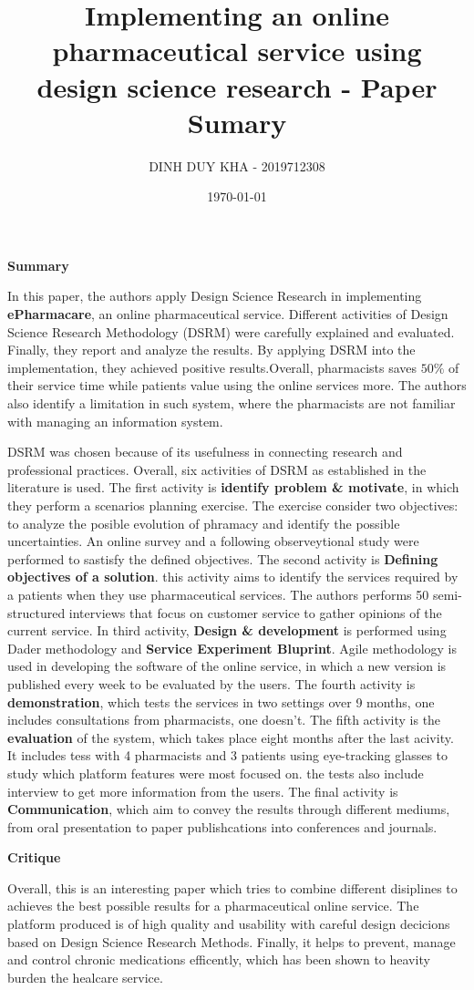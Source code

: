\documentclass[11pt]{article}
\author{DINH DUY KHA - 2019712308}
\date{\today}
\title{Implementing an online pharmaceutical service using design science research - Paper Sumary}
\begin{document}
\maketitle
\tableofcontents

\textbf{Summary}

In this paper, the authors apply Design Science Research in implementing \textbf{ePharmacare}, an online pharmaceutical service. Different activities of Design Science Research Methodology (DSRM) were carefully explained and evaluated. Finally, they report and analyze the results.
By applying DSRM into the implementation, they achieved positive results.Overall, pharmacists saves \(50\%\) of their service time while patients value using the online services more. The authors also identify a limitation in such system, where the pharmacists are not familiar with managing an information system.

DSRM was chosen because of its usefulness in connecting research and professional practices. Overall, six activities of DSRM as established in the literature is used. The first activity is \textbf{identify problem \& motivate}, in which they perform a scenarios planning exercise. The exercise consider two objectives: to analyze the posible evolution of phramacy and identify the possible uncertainties. An online survey and a following observeytional study were performed to sastisfy the defined objectives.
The second activity is \textbf{Defining objectives of a solution}. this activity aims to identify the services required by a patients when they use pharmaceutical services. The authors performs 50 semi-structured interviews that focus on customer service to gather opinions of the current service.
In third activity, \textbf{Design \& development} is performed using  Dader methodology and \textbf{Service Experiment Bluprint}. Agile methodology is used in developing the software of the online service, in which a new version is published every week to be evaluated by the users.
The fourth activity is \textbf{demonstration}, which tests the services in two settings over 9 months, one includes consultations from pharmacists, one doesn't.
The fifth activity is the \textbf{evaluation} of the system, which takes place eight months after the last acivity. It includes tess with 4 pharmacists and 3 patients using eye-tracking glasses to study which platform features were most focused on. the tests also include interview to get more information from the users.
The final activity is \textbf{Communication}, which aim to convey the results through different mediums, from oral presentation to paper publishcations into conferences and journals.

\textbf{Critique}

Overall, this is an interesting paper which tries to combine different disiplines to achieves the best possible results for a pharmaceutical online service. The platform produced is of high quality and usability with careful design decicions based on Design Science Research Methods.
Finally, it helps to prevent, manage and control chronic medications efficently, which has been shown to heavity burden the healcare service.
\end{document}
